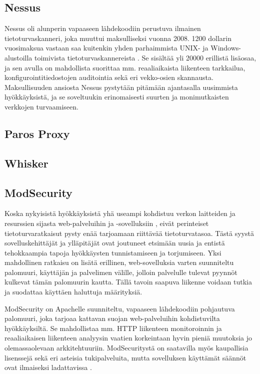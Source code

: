 \subsection{Nessus}

Nessus \cite{Nessus} oli alunperin vapaaseen lähdekoodiin perustuva ilmainen tietoturvaskanneri, joka muuttui maksulliseksi vuonna 2008. 1200 dollarin vuosimaksua vastaan
saa kuitenkin yhden parhaimmista UNIX- ja Windows-alustoilla toimivista tietoturvaskannereista \cite{NST}. Se sisältää yli 20000 erillistä lisäosaa,
ja sen avulla on mahdollista suorittaa mm. reaaliaikaista liikenteen tarkkailua, konfigurointitiedostojen auditointia sekä eri vekko-osien skannausta. Maksullisuuden 
ansiosta Nessus pystytään pitämään ajantasalla uusimmista hyökkäyksistä, ja se soveltuukin erinomaisesti suurten ja monimutkaisten verkkojen turvaamiseen\cite{Nessus}. 

\subsection{Paros Proxy}



\subsection{Whisker}



\subsection{ModSecurity}

Koska nykyisistä hyökkäyksistä yhä useampi kohdistuu verkon laitteiden ja resurssien sijasta web-palveluihin ja -sovelluksiin \cite{WASCb} \cite{SYM}, eivät perinteiset
tietoturvaratkaisut pysty enää tarjoamaan riittävää tietoturvatasoa. Tästä syystä sovelluskehittäjät ja ylläpitäjät ovat joutuneet etsimään uusia ja entistä tehokkaampia 
tapoja hyökkäysten tunnistamiseen ja torjumiseen. Yksi mahdollinen ratkaisu on lisätä erillinen, web-sovelluksia varten suunniteltu palomuuri, käyttäjän ja palvelimen 
välille, jolloin palvelulle tulevat pyynnöt kulkevat tämän palomuurin kautta. Tällä tavoin saapuva liikenne voidaan tutkia ja suodattaa käyttäen haluttuja määrityksiä. 

ModSecurity \cite{Mod}on Apachelle suunniteltu, vapaaseen lähdekoodiin pohjautuva palomuuri, joka tarjoaa kattavan suojan web-palveluihin kohdistuvilta hyökkäyksiltä. 
Se mahdollistaa mm. HTTP liikenteen monitoroinnin ja reaaliaikaisen liikenteen analyysin vaatien korkeintaan hyvin pieniä muutoksia jo olemassaolevaan arkkitehtuuriin.
ModSecuritystä on saatavilla myös kaupallisia lisenssejä sekä eri asteisia tukipalveluita, mutta sovelluksen käyttämät säännöt ovat ilmaiseksi ladattavissa \cite{Mod}.

